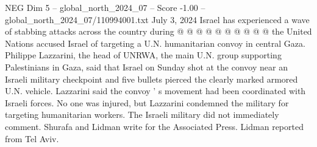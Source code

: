 \begin{textsample}{NEG Dim 5 – global\_north\_2024\_07 – Score -1.00 – global\_north\_2024\_07/110994001.txt}
July 3, 2024 Israel has experienced a wave of stabbing attacks across the country during @ @ @ @ @ @ @ @ @ @ the United Nations accused Israel of targeting a U.N. humanitarian convoy in central Gaza.
Philippe Lazzarini, the head of UNRWA, the main U.N. group supporting Palestinians in Gaza, said that Israel on Sunday shot at the convoy near an Israeli military checkpoint and five bullets pierced the clearly marked armored U.N. vehicle.
Lazzarini said the convoy ' s movement had been coordinated with Israeli forces.
No one was injured, but Lazzarini condemned the military for targeting humanitarian workers.
The Israeli military did not immediately comment.
Shurafa and Lidman write for the Associated Press.
Lidman reported from Tel Aviv.

\end{textsample}
